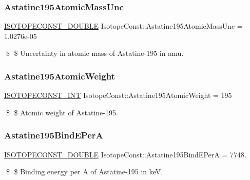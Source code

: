 \subsubsection{\texorpdfstring{Astatine195\+Atomic\+Mass\+Unc}{Astatine195AtomicMassUnc}}
{\footnotesize\ttfamily \mbox{\hyperlink{group___isotope_const-_macros_ga8f45a7272ce02c0b4c65c44636ed719a}{I\+S\+O\+T\+O\+P\+E\+C\+O\+N\+S\+T\+\_\+\+D\+O\+U\+B\+LE}} Isotope\+Const\+::\+Astatine195\+Atomic\+Mass\+Unc = 1.\+0276e-\/05}

\$ \$ Uncertainty in atomic mass of Astatine-\/195 in amu. \mbox{\label{group___isotope_const-_astatine-_at195_gaa64e22d8d278e02734c570fbc0911b81}} 
\subsubsection{\texorpdfstring{Astatine195\+Atomic\+Weight}{Astatine195AtomicWeight}}
{\footnotesize\ttfamily \mbox{\hyperlink{group___isotope_const-_macros_ga5f18360b3e99483a35c32d789e62621c}{I\+S\+O\+T\+O\+P\+E\+C\+O\+N\+S\+T\+\_\+\+I\+NT}} Isotope\+Const\+::\+Astatine195\+Atomic\+Weight = 195}

\$ \$ Atomic weight of Astatine-\/195. \mbox{\label{group___isotope_const-_astatine-_at195_gabfa0535360545c1d01bc45dc9e61b9d5}} 
\subsubsection{\texorpdfstring{Astatine195\+Bind\+E\+PerA}{Astatine195BindEPerA}}
{\footnotesize\ttfamily \mbox{\hyperlink{group___isotope_const-_macros_ga8f45a7272ce02c0b4c65c44636ed719a}{I\+S\+O\+T\+O\+P\+E\+C\+O\+N\+S\+T\+\_\+\+D\+O\+U\+B\+LE}} Isotope\+Const\+::\+Astatine195\+Bind\+E\+PerA = 7748.}

\$ \$ Binding energy per A of Astatine-\/195 in keV. \mbox{\label{group___isotope_const-_astatine-_at195_ga234f45d0df4646fce9d42725d6930636}} 
